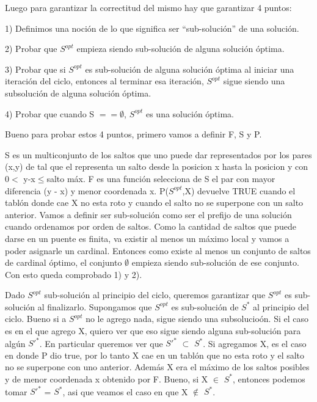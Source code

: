 Luego para garantizar la correctitud del mismo hay que garantizar 4 puntos:


1) Definimos una noci\'on de lo que significa ser “sub-soluci\'on” de una soluci\'on.

2) Probar que $S^{opt}$ empieza siendo sub-soluci\'on de alguna soluci\'on \'optima.

3) Probar que si  $S^{opt}$ es sub-soluci\'on de alguna soluci\'on \'optima al iniciar 	una iteraci\'on del ciclo, entonces al terminar  esa iteraci\'on, $S^{opt}$ sigue siendo una subsoluci\'on de alguna soluci\'on \'optima.

4) Probar que cuando S $== \emptyset$, $S^{opt}$ es una soluci\'on \'optima.

Bueno para probar estos 4 puntos, primero vamos a definir F, S y P.


S es un multiconjunto de los saltos que uno puede dar representados por los pares (x,y) de tal que el representa un salto desde la posicion x hasta la posicion y con 0$<$ y-x$\leq$salto m\'ax.
F es una funci\'on selecciona de S el par con mayor diferencia (y - x) y menor coordenada x.
P($S^{opt}$,X) devuelve TRUE cuando el tabl\'on donde cae X no esta roto y cuando el salto no se superpone con un salto anterior.
Vamos a definir ser sub-soluci\'on como ser el prefijo de una soluci\'on cuando ordenamos por orden de saltos.
Como la cantidad de saltos que puede darse en un puente es finita, va existir al menos un m\'aximo local y vamos a poder asignarle un cardinal. Entonces como existe al menos un conjunto de saltos de cardinal \'optimo, el conjunto $\emptyset$ empieza siendo sub-soluci\'on de ese conjunto.
Con esto queda comprobado 1) y 2).

Dado $S^{opt}$ sub-soluci\'on al principio del ciclo, queremos garantizar que $S^{opt}$ es sub-soluci\'on al finalizarlo.
Supongamos que $S^{opt}$ es sub-soluci\'on de $S^{*}$ al principio del ciclo.
Bueno si a $S^{opt}$ no le agrego nada, sigue siendo una subsolucio\'on.
Si el caso es en el que agrego X, quiero ver que eso sigue siendo alguna sub-soluci\'on para alg\'un $S'^{*}$. En particular queremos ver que $S'^{*}$ $\subset$ $S^{*}$. 
Si agregamos X, es el caso en donde P dio true, por lo tanto X cae en un tabl\'on que no esta roto y el salto no se superpone con uno anterior.
Adem\'as X era el m\'aximo de los saltos posibles y de menor coordenada x obtenido por F.
Bueno, si X $\in$ $S^{*}$, entonces podemos tomar $S'^{*}$ = $S^{*}$, asi que veamos el caso en que X $\notin$ $S^{*}$.

